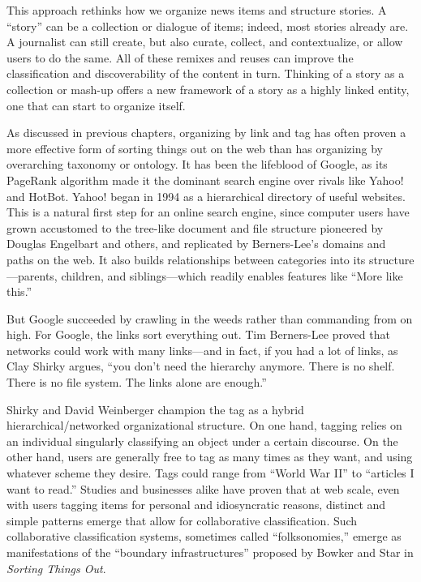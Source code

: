 This approach rethinks how we organize news items and structure stories. A ``story'' can be a collection or dialogue of items; indeed, most stories already are. A journalist can still create, but also curate, collect, and contextualize, or allow users to do the same. All of these remixes and reuses can improve the classification and discoverability of the content in turn. Thinking of a story as a collection or mash-up offers a new framework of a story as a highly linked entity, one that can start to organize itself.

As discussed in previous chapters, organizing by link and tag has often proven a more effective form of sorting things out on the web than has organizing by overarching taxonomy or ontology. It has been the lifeblood of Google, as its PageRank algorithm made it the dominant search engine over rivals like Yahoo! and HotBot.\autocite{shirky_ontology_2005} Yahoo! began in 1994 as a hierarchical directory of useful websites. This is a natural first step for an online search engine, since computer users have grown accustomed to the tree-like document and file structure pioneered by Douglas Engelbart and others, and replicated by Berners-Lee's domains and paths on the web. It also builds relationships between categories into its structure---parents, children, and siblings---which readily enables features like ``More like this.''

But Google succeeded by crawling in the weeds rather than commanding from on high. For Google, the links sort everything out. Tim Berners-Lee proved that networks could work with many links---and in fact, if you had a lot of links, as Clay Shirky argues, ``you don't need the hierarchy anymore. There is no shelf. There is no file system. The links alone are enough.''\autocite{shirky_ontology_2005}

Shirky and David Weinberger champion the tag as a hybrid hierarchical/networked organizational structure. On one hand, tagging relies on an individual singularly classifying an object under a certain discourse. On the other hand, users are generally free to tag as many times as they want, and using whatever scheme they desire. Tags could range from ``World War II'' to ``articles I want to read.'' Studies and businesses alike have proven that at web scale, even with users tagging items for personal and idiosyncratic reasons, distinct and simple patterns emerge that allow for collaborative classification.\autocite{cattuto_semiotic_2007} Such collaborative classification systems, sometimes called ``folksonomies,'' emerge as manifestations of the ``boundary infrastructures'' proposed by Bowker and Star in \emph{Sorting Things Out}.\autocite{bowker_sorting_2000}

